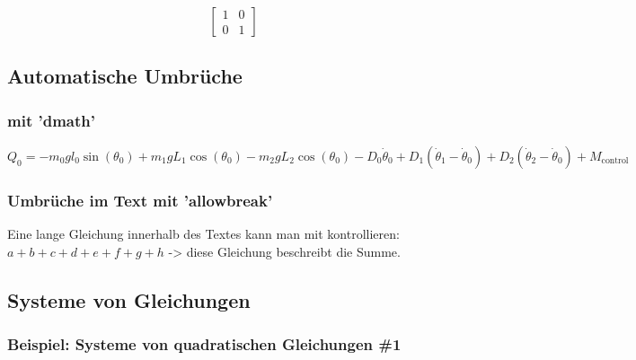 \documentclass{scrartcl}
\begin{document}
\begin{displaymath}
[
\begin{matrix}
	1 & 0\\
	0 & 1
\end{matrix}
]
\end{displaymath}

\begin{equation}
\left[
\begin{matrix}
	1 & 0\\
	0 & 1
\end{matrix}
\right]
\end{equation}

\subsection*{Automatische Umbrüche}
\subsubsection*{mit 'dmath'}
\begin{dmath} %
	Q_0 =
	-m_0 g l_0 \sin(\theta_0)
	+m_1 g L_1 \cos(\theta_0)
	-m_2 g L_2 \cos(\theta_0)
	-D_0 \dot{\theta}_0
	+D_1(\dot{\theta}_1-\dot{\theta}_0)
	+D_2(\dot{\theta}_2-\dot{\theta}_0)
	+M_{\mathrm{control}}
\end{dmath}

\subsubsection*{Umbrüche im Text mit 'allowbreak'}
Eine lange Gleichung innerhalb des Textes kann man mit kontrollieren:  $\allowbreak a+b+c+d+e+f+g+h$ -> diese Gleichung beschreibt die Summe.


\newpage
\subsection*{Systeme von Gleichungen}
\subsubsection*{Beispiel: Systeme von quadratischen Gleichungen \#1}
\end{document}

